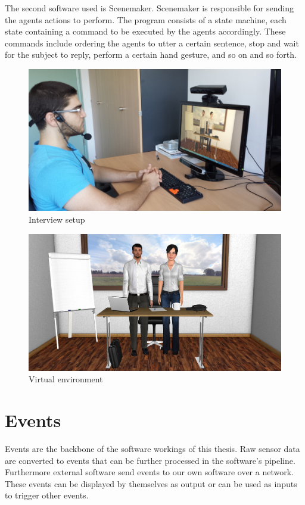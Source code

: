 \documentclass[12pt, a4paper, fleqn]{memoir}%
\begin{document}
The second software used is Scenemaker. Scenemaker is responsible for sending the agents actions to perform. The program consists of a state machine, each state containing a command to be executed by the agents accordingly. These commands include ordering the agents to utter a certain sentence, stop and wait for the subject to reply, perform a certain hand gesture, and so on and so forth.

\begin{figure}[h]
    \centering
    \includegraphics[width=1\textwidth]{setup}
    \caption{Interview setup}
    \label{fig:setup_img}
\end{figure}

\begin{figure}[h]
    \centering
    \includegraphics[width=1\textwidth]{agents}
    \caption{Virtual environment}
    \label{fig:agents_img}
\end{figure}

\chapter{Events}
\label{chap:Events}
Events are the backbone of the software workings of this thesis. Raw sensor data are converted to events that can be further processed in the software's pipeline. Furthermore external software send events to our own software over a network. These events can be displayed by themselves as output or can be used as inputs to trigger other events.
\end{document}
